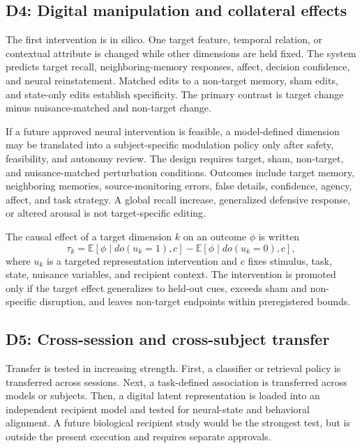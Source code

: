 \documentclass[conference]{IEEEtran}
\begin{document}
\subsection{D4: Digital manipulation and collateral effects}
The first intervention is in silico. One target feature, temporal relation, or contextual attribute is changed while other dimensions are held fixed. The system predicts target recall, neighboring-memory responses, affect, decision confidence, and neural reinstatement. Matched edits to a non-target memory, sham edits, and state-only edits establish specificity. The primary contrast is target change minus nuisance-matched and non-target change.

If a future approved neural intervention is feasible, a model-defined dimension may be translated into a subject-specific modulation policy only after safety, feasibility, and autonomy review. The design requires target, sham, non-target, and nuisance-matched perturbation conditions. Outcomes include target memory, neighboring memories, source-monitoring errors, false details, confidence, agency, affect, and task strategy. A global recall increase, generalized defensive response, or altered arousal is not target-specific editing.

The causal effect of a target dimension $k$ on an outcome $\phi$ is written
\begin{equation}
\tau_k=\mathbb{E}[\phi\mid do(u_k=1),c]-\mathbb{E}[\phi\mid do(u_k=0),c],
\label{eq:causal}
\end{equation}
where $u_k$ is a targeted representation intervention and $c$ fixes stimulus, task, state, nuisance variables, and recipient context. The intervention is promoted only if the target effect generalizes to held-out cues, exceeds sham and non-specific disruption, and leaves non-target endpoints within preregistered bounds.

\subsection{D5: Cross-session and cross-subject transfer}
Transfer is tested in increasing strength. First, a classifier or retrieval policy is transferred across sessions. Next, a task-defined association is transferred across models or subjects. Then, a digital latent representation is loaded into an independent recipient model and tested for neural-state and behavioral alignment. A future biological recipient study would be the strongest test, but is outside the present execution and requires separate approvals.
\end{document}
